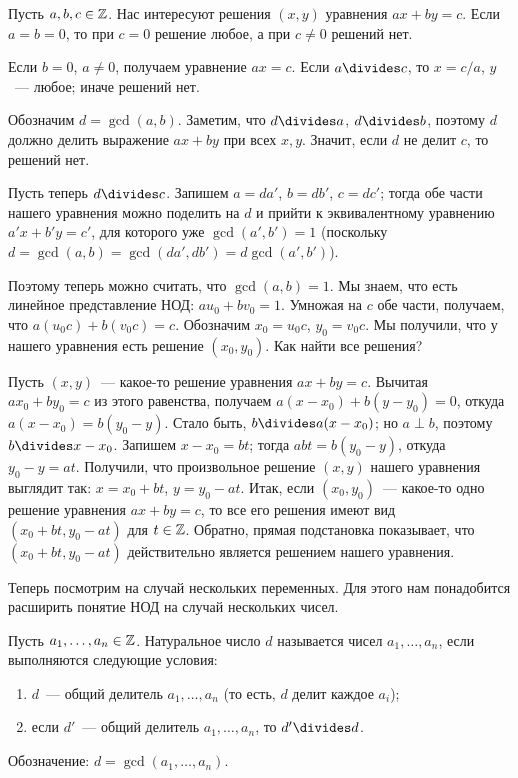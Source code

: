 
Пусть $a,b,c\in\mathbb Z$.
Нас интересуют решения $(x,y)$ уравнения $ax+by=c$.
Если $a=b=0$, то при $c=0$ решение любое, а при $c\neq 0$ решений нет.

Если $b=0$, $a\neq 0$, получаем уравнение $ax=c$. Если $a\divides c$, то
$x=c/a$, $y$~--- любое; иначе решений нет.

Обозначим $d=\gcd(a,b)$. Заметим, что $d\divides a$, $d\divides b$,
поэтому $d$ должно делить выражение
$ax+by$ при всех $x,y$. Значит, если $d$ не делит $c$,
то решений нет.

Пусть теперь $d\divides c$. Запишем $a=da'$, $b=db'$,
$c=dc'$; тогда обе части нашего уравнения можно
поделить на $d$ и прийти к эквивалентному уравнению $a'x+b'y=c'$, для
которого уже $\gcd(a',b')=1$ (поскольку
$d=\gcd(a,b)=\gcd(da',db')=d\gcd(a',b')$).

Поэтому теперь можно считать, что $\gcd(a,b)=1$.
Мы знаем, что есть линейное представление НОД:
$au_0+bv_0=1$. Умножая на $c$ обе части, получаем, что
$a(u_0c)+b(v_0c)=c$. Обозначим $x_0=u_0c$, $y_0=v_0c$. Мы получили,
что у нашего уравнения есть решение $(x_0,y_0)$. Как найти все
решения?

Пусть $(x,y)$~--- какое-то решение уравнения $ax+by=c$. Вычитая
$ax_0+by_0=c$ из этого равенства, получаем $a(x-x_0)+b(y-y_0)=0$,
откуда $a(x-x_0)=b(y_0-y)$. Стало быть, $b\divides a(x-x_0)$; но $a\perp
b$, поэтому $b\divides x-x_0$. Запишем $x-x_0=bt$; тогда $abt=b(y_0-y)$,
откуда $y_0-y=at$. Получили, что произвольное решение $(x,y)$ нашего
уравнения выглядит так: $x=x_0+bt$, $y=y_0-at$. Итак, если
$(x_0,y_0)$~--- какое-то одно решение уравнения $ax+by=c$, то все его
решения имеют вид $(x_0+bt,y_0-at)$ для $t\in\mathbb Z$. Обратно, прямая
подстановка показывает, что $(x_0+bt,y_0-at)$ действительно является
решением нашего уравнения.

Теперь посмотрим на случай нескольких переменных. Для этого нам
понадобится расширить понятие НОД на случай нескольких чисел.

\begin{definition}
Пусть $a_1,\dots,a_n\in\mathbb Z$. Натуральное число $d$ называется
 чисел $a_1,\dots,a_n$, если
выполняются следующие условия:
\begin{enumerate}
\item $d$~--- общий делитель $a_1,\dots,a_n$ (то есть, $d$ делит
  каждое $a_i$);
\item если $d'$~--- общий делитель $a_1,\dots,a_n$, то $d'\divides d$.
\end{enumerate}
Обозначение: $d=\gcd(a_1,\dots,a_n)$.
\end{definition}

